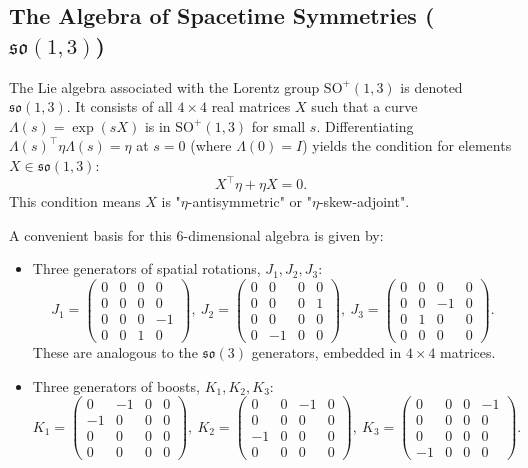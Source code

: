 \documentclass{amsart}
\theoremstyle{definition}
\theoremstyle{remark}
\begin{document}
\subsection{The Algebra of Spacetime Symmetries ($\mathfrak{so}(1,3)$)}
\label{subsec:so13_algebra}
The Lie algebra associated with the Lorentz group $\mathrm{SO}^+(1,3)$ is denoted $\mathfrak{so}(1,3)$. It consists of all \(4 \times 4\) real matrices \(X\) such that a curve $\Lambda(s) = \exp(sX)$ is in $\mathrm{SO}^+(1,3)$ for small $s$. Differentiating $\Lambda(s)^\top \eta \Lambda(s) = \eta$ at $s=0$ (where $\Lambda(0)=I$) yields the condition for elements $X \in \mathfrak{so}(1,3)$:
\[
X^\top \eta + \eta X = 0.
\]
This condition means $X$ is "$\eta$-antisymmetric" or "$\eta$-skew-adjoint".

A convenient basis for this 6-dimensional algebra is given by:
\begin{itemize}
    \item Three generators of spatial rotations, $J_1, J_2, J_3$:
    \[ J_1 = \begin{pmatrix} 0&0&0&0 \\ 0&0&0&0 \\ 0&0&0&-1 \\ 0&0&1&0 \end{pmatrix}, \
       J_2 = \begin{pmatrix} 0&0&0&0 \\ 0&0&0&1 \\ 0&0&0&0 \\ 0&-1&0&0 \end{pmatrix}, \
       J_3 = \begin{pmatrix} 0&0&0&0 \\ 0&0&-1&0 \\ 0&1&0&0 \\ 0&0&0&0 \end{pmatrix}.
    \]
    These are analogous to the $\mathfrak{so}(3)$ generators, embedded in $4 \times 4$ matrices.
    \item Three generators of boosts, $K_1, K_2, K_3$:
    \[ K_1 = \begin{pmatrix} 0&-1&0&0 \\ -1&0&0&0 \\ 0&0&0&0 \\ 0&0&0&0 \end{pmatrix}, \
       K_2 = \begin{pmatrix} 0&0&-1&0 \\ 0&0&0&0 \\ -1&0&0&0 \\ 0&0&0&0 \end{pmatrix}, \
       K_3 = \begin{pmatrix} 0&0&0&-1 \\ 0&0&0&0 \\ 0&0&0&0 \\ -1&0&0&0 \end{pmatrix}.
    \]
\end{itemize}
\end{document}
